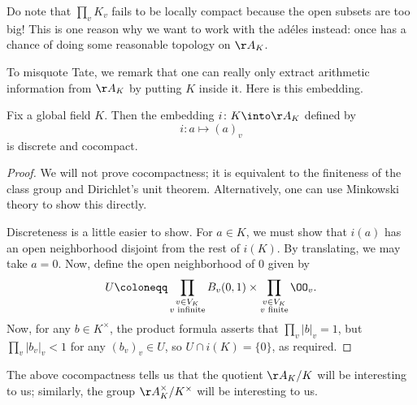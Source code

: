 \documentclass{article}
\begin{document}
\begin{remark}
	Do note that $\prod_vK_v$ fails to be locally compact because the open subsets are too big! This is one reason why we want to work with the ad\'eles instead: once has a chance of doing some reasonable topology on $\AA_K$.
\end{remark}
To misquote Tate, we remark that one can really only extract arithmetic information from $\AA_K$ by putting $K$ inside it. Here is this embedding.
\begin{proposition}
	Fix a global field $K$. Then the embedding $i\colon K\into\AA_K$ defined by
	\[i\colon a\mapsto(a)_v\]
	is discrete and cocompact.
\end{proposition}
\begin{proof}
	We will not prove cocompactness; it is equivalent to the finiteness of the class group and Dirichlet's unit theorem. Alternatively, one can use Minkowski theory to show this directly.

	Discreteness is a little easier to show. For $a\in K$, we must show that $i(a)$ has an open neighborhood disjoint from the rest of $i(K)$. By translating, we may take $a=0$. Now, define the open neighborhood of $0$ given by
	\[U\coloneqq\prod_{\substack{v\in V_K\\v\text{ infinite}}}B_v(0,1)\times\prod_{\substack{v\in V_K\\v\text{ finite}}}\OO_v.\]
	Now, for any $b\in K^\times$, the product formula asserts that $\prod_v\left|b\right|_v=1$, but $\prod_v\left|b_v\right|_v<1$ for any $(b_v)_v\in U$, so $U\cap i(K)=\{0\}$, as required.
\end{proof}
The above cocompactness tells us that the quotient $\AA_K/K$ will be interesting to us; similarly, the group $\AA_K^\times/K^\times$ will be interesting to us.
\end{document}
